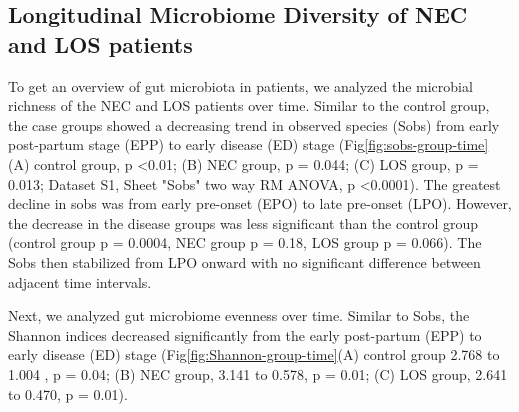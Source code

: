 \documentclass[fleqn,10pt]{wlpeerj} %
\begin{document}
   \subsection*{Longitudinal Microbiome Diversity of NEC and LOS patients}
    To get an overview of gut microbiota in patients, we analyzed the microbial richness of the NEC and LOS patients over time.  Similar to the control group, the case groups showed a decreasing trend in observed species (Sobs) from early post-partum stage (EPP) to early disease (ED) stage (Fig\ref{fig:sobs-group-time} (A) control group, p \textless 0.01; (B) NEC group, p = 0.044; (C) LOS group, p = 0.013; Dataset S1, Sheet "Sobs" two way RM ANOVA, p \textless 0.0001).  The greatest decline in sobs was from early pre-onset (EPO) to late pre-onset (LPO).  However, the decrease in the disease groups was less significant than the control group (control group p = 0.0004, NEC group p = 0.18, LOS group p = 0.066). The Sobs then stabilized from LPO onward with no significant difference between adjacent time intervals.


    Next, we analyzed gut microbiome evenness over time. Similar to Sobs, the Shannon indices decreased significantly from the early post-partum (EPP) to early disease (ED) stage (Fig\ref{fig:Shannon-group-time}(A) control group 2.768 to 1.004 , p = 0.04; (B) NEC group, 3.141 to 0.578, p = 0.01; (C) LOS group, 2.641 to 0.470, p = 0.01).

\end{document}
